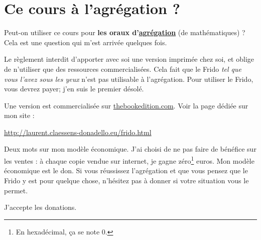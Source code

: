 
\section*{Ce cours à l'agrégation ?}

Peut-on utiliser ce cours pour \textbf{les oraux d'\href{http://agreg.org/}{agrégation}} (de mathématiques) ?  Cela est une question qui m'est arrivée quelques fois.  

Le règlement interdit d'apporter avec soi une version imprimée chez soi, et oblige de n'utiliser que des ressources commercialisées. Cela fait que le Frido \emph{tel que vous l'avez sous les yeux} n'est pas utilisable à l'agrégation. Pour utiliser le Frido, vous devrez payer; j'en suis le premier désolé.

Une version est commercialisée sur \href{http://www.thebookedition.com/fr/}{thebookedition.com}. Voir la page dédiée sur mon site :
\begin{center}
    \url{http://laurent.claessens-donadello.eu/frido.html}
\end{center}

Deux mots sur mon modèle économique. J'ai choisi de ne pas faire de bénéfice sur les ventes : à chaque copie vendue sur internet, je gagne zéro\footnote{En hexadécimal, ça se note \( 0\).} euros. Mon modèle économique est le don. Si vous réussissez l'agrégation et que vous pensez que le Frido y est pour quelque chose, n'hésitez pas à donner si votre situation vous le permet.

\vfill

J'accepte les donations.


